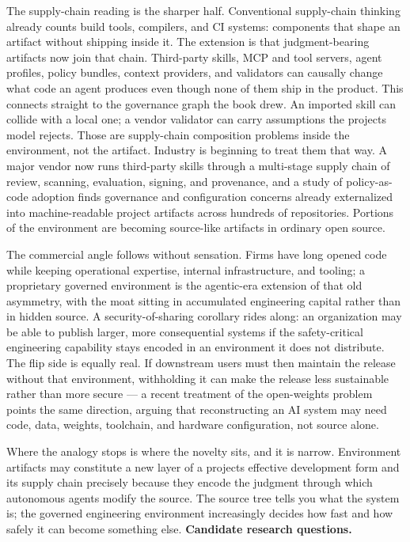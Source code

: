 The supply-chain reading is the sharper half. Conventional supply-chain thinking already counts build tools, compilers, and CI systems: components that shape an artifact without shipping inside it. The extension is that judgment-bearing artifacts now join that chain. Third-party skills, MCP and tool servers, agent profiles, policy bundles, context providers, and validators can causally change what code an agent produces even though none of them ship in the product. This connects straight to the governance graph the book drew. An imported skill can collide with a local one; a vendor validator can carry assumptions the project\textquotesingle s model rejects. Those are supply-chain composition problems inside the environment, not the artifact. Industry is beginning to treat them that way. A major vendor now runs third-party skills through a multi-stage supply chain of review, scanning, evaluation, signing, and provenance,\citep{nvidia2026verifiedskills} and a study of policy-as-code adoption finds governance and configuration concerns already externalized into machine-readable project artifacts across hundreds of repositories.\citep{foalem2026policyascode} Portions of the environment are becoming source-like artifacts in ordinary open source.

The commercial angle follows without sensation. Firms have long opened code while keeping operational expertise, internal infrastructure, and tooling; a proprietary governed environment is the agentic-era extension of that old asymmetry, with the moat sitting in accumulated engineering capital rather than in hidden source. A security-of-sharing corollary rides along: an organization may be able to publish larger, more consequential systems if the safety-critical engineering capability stays encoded in an environment it does not distribute. The flip side is equally real. If downstream users must then maintain the release without that environment, withholding it can make the release less sustainable rather than more secure --- a recent treatment of the open-weights problem points the same direction, arguing that reconstructing an AI system may need code, data, weights, toolchain, and hardware configuration, not source alone.\citep{hatta2026reproducibility}

Where the analogy stops is where the novelty sits, and it is narrow. Environment artifacts may constitute a new layer of a project\textquotesingle s effective development form and its supply chain precisely because they encode the judgment through which autonomous agents modify the source. The source tree tells you what the system is; the governed engineering environment increasingly decides how fast and how safely it can become something else. \textbf{Candidate research questions.}

